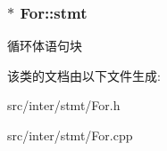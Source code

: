 \subsubsection[{\texorpdfstring{stmt}{stmt}}]{$\ast$ For\+::stmt}\hypertarget{class_for_af269abab55eae120cccbd1c76b0c5011}{}\label{class_for_af269abab55eae120cccbd1c76b0c5011}
循环体语句块 

该类的文档由以下文件生成\+:\begin{DoxyCompactItemize}
\item 
src/inter/stmt/For.\+h\item 
src/inter/stmt/For.\+cpp\end{DoxyCompactItemize}

